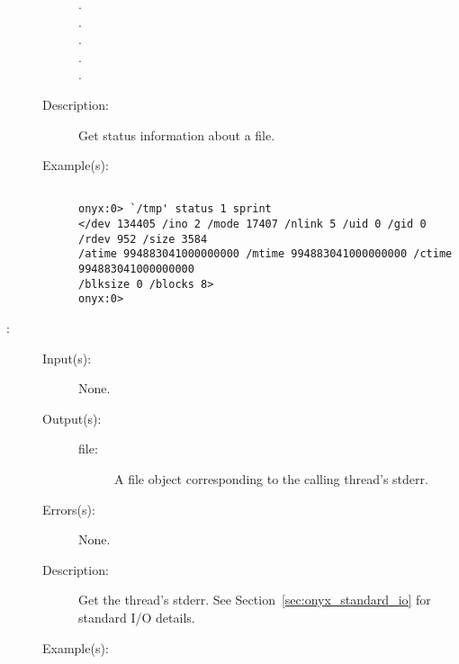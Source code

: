 \begin{description}
\begin{description}
\begin{description}
		\item[.]
		\item[.]
		\item[.]
		\item[.]
		\item[.]
		\end{description}
	\item[Description: ]
		Get status information about a file.
	\item[Example(s): ]\begin{verbatim}

onyx:0> `/tmp' status 1 sprint
</dev 134405 /ino 2 /mode 17407 /nlink 5 /uid 0 /gid 0 /rdev 952 /size 3584
/atime 994883041000000000 /mtime 994883041000000000 /ctime 994883041000000000
/blksize 0 /blocks 8>
onyx:0>
		\end{verbatim}
	\end{description}
\label{systemdict:stderr}
\item[{\onyxop{--}{stderr}{file}}: ]
	\begin{description}\item[]
	\item[Input(s): ] None.
	\item[Output(s): ]
		\begin{description}\item[]
		\item[file: ]
			A file object corresponding to the calling thread's
			stderr.
		\end{description}
	\item[Errors(s): ] None.
	\item[Description: ]
		Get the thread's stderr.  See Section~\ref{sec:onyx_standard_io}
		for standard I/O details.
	\item[Example(s): ]\begin{verbatim}


\end{verbatim}
\end{description}
\end{description}

